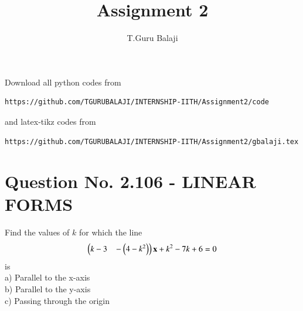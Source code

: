 \documentclass[journal,12pt,twocolumn]{IEEEtran}
\begin{document}
\makeatletter
{}
\makeatother
\let\StandardTheFigure\thefigure
\let\vec\mathbf
\renewcommand{\thefigure}{\theproblem}
\def\putbox#1#2#3{\makebox[0in][l]{\makebox[#1][l]{}\raisebox{\baselineskip}[0in][0in]{\raisebox{#2}[0in][0in]{#3}}}}
     \def\rightbox#1{\makebox[0in][r]{#1}}
     \def\centbox#1{\makebox[0in]{#1}}
     \def\topbox#1{\raisebox{-\baselineskip}[0in][0in]{#1}}
     \def\midbox#1{\raisebox{-0.5\baselineskip}[0in][0in]{#1}}
\vspace{3cm}
\title{Assignment 2}
\author{T.Guru Balaji}
\maketitle
\newpage
\bigskip
\renewcommand{\thefigure}{\theenumi}
\renewcommand{\thetable}{\theenumi}
Download all python codes from 
\begin{lstlisting}
https://github.com/TGURUBALAJI/INTERNSHIP-IITH/Assignment2/code
\end{lstlisting}
%
and latex-tikz codes from 
%
\begin{lstlisting}
https://github.com/TGURUBALAJI/INTERNSHIP-IITH/Assignment2/gbalaji.tex
\end{lstlisting}
\section{\textbf{Question No. 2.106 - LINEAR FORMS}}
Find the values of $k$ for which the line\\
\begin{align}
\myvec{k-3 \hspace{3mm}-\myvec{4-k^2}}\vec{x}+k^2-7k+6=0
\end{align}
is\\
a) Parallel to the x-axis\\
b) Parallel to the y-axis\\
c) Passing through the origin\\
%
\end{document}
